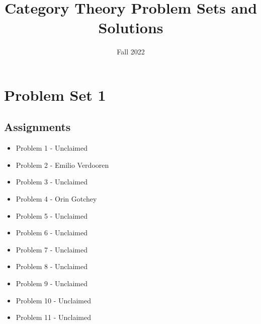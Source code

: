 \documentclass{article}
\title{Category Theory Problem Sets and Solutions}
\author{Fall 2022}
\begin{document}
\maketitle
\tableofcontents
\newpage
\section{Problem Set 1}
\subsection{Assignments}
\begin{itemize}
    \item Problem 1 - Unclaimed
    \item Problem 2 - Emilio Verdooren
    \item Problem 3 - Unclaimed
    \item Problem 4 - Orin Gotchey
    \item Problem 5 - Unclaimed
    \item Problem 6 - Unclaimed
    \item Problem 7 - Unclaimed
    \item Problem 8 - Unclaimed
    \item Problem 9 - Unclaimed
    \item Problem 10 - Unclaimed
    \item Problem 11 - Unclaimed
\end{itemize}
\end{document}
